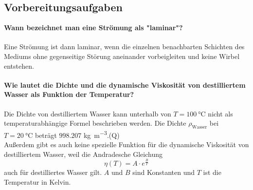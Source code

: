         \subsection{Vorbereitungsaufgaben}
            \label{sec:Vorbereitungsaufgaben}
            \textbf{Wann bezeichnet man eine Strömung als "laminar"?}\\
            \\
            Eine Strömung ist dann laminar, wenn die einzelnen benachbarten Schichten 
            des Mediums ohne gegenseitige Störung aneinander vorbeigleiten und 
            keine Wirbel entstehen. \\ 
            \\
            \textbf{Wie lautet die Dichte und die dynamische Viskosität von 
            destilliertem Wasser als Funktion der Temperatur?}\\
            \\
            Die Dichte von destilliertem Wasser kann unterhalb von  
            $T=\SI{100}{\celsius}$ nicht als temperaturabhängige Formel 
            beschrieben werden.
            Die Dichte $\rho_{\text{Wasser}}$ bei $T=\SI{20}{\celsius}$ beträgt $998.207$ 
            \unit[per-mode=fraction]{\kilo\gram\per\meter\tothe{3}}.(Q\cite{dichte})\\
            Außerdem gibt es auch keine spezielle Funktion für die dynamische
            Viskosität von destilliertem Wasser, weil die Andradesche Gleichung 
            \begin{equation}
            \eta (T) = A \cdot e^{\frac{B}{T}}
            \label{eqn:AndradescheGleichung}
            \end{equation} 
            auch für destilliertes Wasser gilt. $A$ und $B$ sind Konstanten und $T$ ist die Temperatur in Kelvin. 
